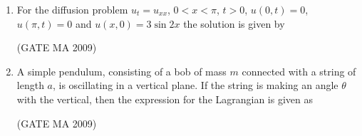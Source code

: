 \documentclass[journal,12pt,onecolumn]{IEEEtran}
\theoremstyle{remark}
\begin{document}
\begin{enumerate}[leftmargin=0pt, align=left, start=21]
\item For the diffusion problem $u_t=u_{xx}$, $0<x<\pi$, $t>0$, $u(0,t)=0$, $u(\pi,t)=0$ and $u(x,0)=3\sin 2x$ the solution is given by
\begin{enumerate}
\end{enumerate}
\hfill (GATE MA 2009)

\item A simple pendulum, consisting of a bob of mass $m$ connected with a string of length $a$, is oscillating in a vertical plane. If the string is making an angle $\theta$ with the vertical, then the expression for the Lagrangian is given as
\begin{enumerate}
\end{enumerate}
\hfill (GATE MA 2009)


\end{enumerate}
\end{document}
